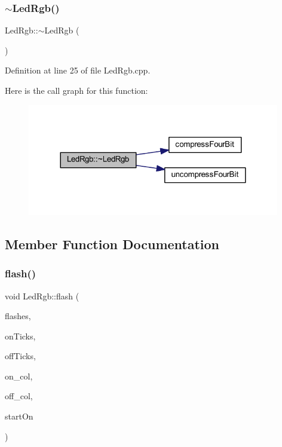 \subsubsection{\texorpdfstring{$\sim$\+Led\+Rgb()}{~LedRgb()}}
{\footnotesize\ttfamily Led\+Rgb\+::$\sim$\+Led\+Rgb (\begin{DoxyParamCaption}{ }\end{DoxyParamCaption})}



Definition at line 25 of file Led\+Rgb.\+cpp.

Here is the call graph for this function\+:
\nopagebreak
\begin{figure}[H]
\begin{center}
\leavevmode
\includegraphics[width=312pt]{dc/d6d/class_led_rgb_a4fac00de3a6801fd9da322eab7e04765_cgraph}
\end{center}
\end{figure}


\subsection{Member Function Documentation}
\mbox{\label{class_led_rgb_a8d81b6020efb6e5f786542451d4dffbc}} 
\subsubsection{\texorpdfstring{flash()}{flash()}}
{\footnotesize\ttfamily void Led\+Rgb\+::flash (\begin{DoxyParamCaption}\item[{unsigned char}]{flashes,  }\item[{unsigned char}]{on\+Ticks,  }\item[{unsigned char}]{off\+Ticks,  }\item[{\hyperlink{class_led_rgb_af328c665510f921f0dfed643f939087b}{Led\+Rgb\+Colour}}]{on\+\_\+col,  }\item[{\hyperlink{class_led_rgb_af328c665510f921f0dfed643f939087b}{Led\+Rgb\+Colour}}]{off\+\_\+col,  }\item[{bool}]{start\+On }\end{DoxyParamCaption})}



